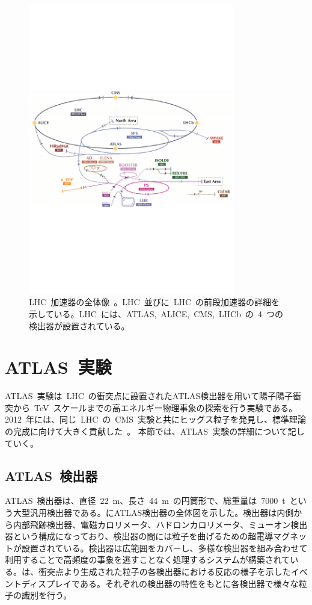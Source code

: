 \begin{figure}[tbp]
        \centering   
        \includegraphics[width=0.8\textwidth]{img/jpeg/lhclhc.pdf}
        \caption[LHC 加速器の全体像]{LHC~加速器の全体像~\cite{URL:01}。LHC~並びに~LHC~の前段加速器の詳細を示している。LHC~には、ATLAS,~ALICE,~CMS,~LHCb~の~4~つの検出器が設置されている。}\label{fig:lhc}
\end{figure}
\section{ATLAS~実験}
ATLAS~実験は~LHC~の衝突点に設置されたATLAS検出器を用いて陽子陽子衝突から~TeV~スケールまでの高エネルギー物理事象の探索を行う実験である。2012~年には、同じ~LHC~の~CMS~実験と共にヒッグス粒子を発見し、標準理論の完成に向けて大きく貢献した~\cite{TR:03,TR:03a}。
本節では、ATLAS~実験の詳細について記していく。
\subsection{ATLAS~検出器}
ATLAS~検出器は、直径~22~m、長さ~44~m~の円筒形で、総重量は~7000~t~という大型汎用検出器である。にATLAS検出器の全体図を示した。検出器は内側から内部飛跡検出器、電磁カロリメータ、ハドロンカロリメータ、ミューオン検出器という構成になっており、検出器の間には粒子を曲げるための超電導マグネットが設置されている。検出器は広範囲をカバーし、多様な検出器を組み合わせて利用することで高頻度の事象を逃すことなく処理するシステムが構築されている。は、衝突点より生成された粒子の各検出器における反応の様子を示したイベントディスプレイである。それぞれの検出器の特性をもとに各検出器で様々な粒子の識別を行う。

